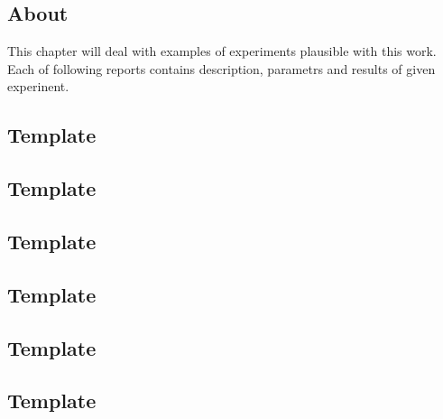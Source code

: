 \subsection{About}
This chapter will deal with examples of experiments plausible with this work. 
Each of following reports contains description, parametrs and results of given experinent.
\newpage
\subsection{Template}

\newpage
\subsection{Template}

\newpage
\subsection{Template}

\newpage
\subsection{Template}

\newpage
\subsection{Template}

\newpage
\subsection{Template}

\newpage